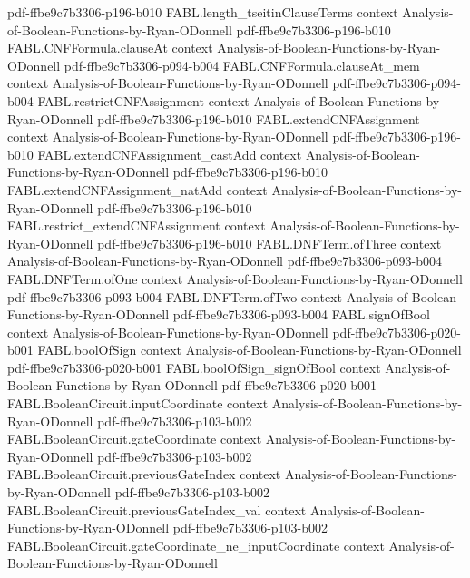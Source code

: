 \begin{theorem}
  {pdf-ffbe9c7b3306-p196-b010}
\proofstep
  {FABL.length_tseitinClauseTerms}
  {context}
  {Analysis-of-Boolean-Functions-by-Ryan-ODonnell}
  {pdf-ffbe9c7b3306-p196-b010}
\proofstep
  {FABL.CNFFormula.clauseAt}
  {context}
  {Analysis-of-Boolean-Functions-by-Ryan-ODonnell}
  {pdf-ffbe9c7b3306-p094-b004}
\proofstep
  {FABL.CNFFormula.clauseAt_mem}
  {context}
  {Analysis-of-Boolean-Functions-by-Ryan-ODonnell}
  {pdf-ffbe9c7b3306-p094-b004}
\proofstep
  {FABL.restrictCNFAssignment}
  {context}
  {Analysis-of-Boolean-Functions-by-Ryan-ODonnell}
  {pdf-ffbe9c7b3306-p196-b010}
\proofstep
  {FABL.extendCNFAssignment}
  {context}
  {Analysis-of-Boolean-Functions-by-Ryan-ODonnell}
  {pdf-ffbe9c7b3306-p196-b010}
\proofstep
  {FABL.extendCNFAssignment_castAdd}
  {context}
  {Analysis-of-Boolean-Functions-by-Ryan-ODonnell}
  {pdf-ffbe9c7b3306-p196-b010}
\proofstep
  {FABL.extendCNFAssignment_natAdd}
  {context}
  {Analysis-of-Boolean-Functions-by-Ryan-ODonnell}
  {pdf-ffbe9c7b3306-p196-b010}
\proofstep
  {FABL.restrict_extendCNFAssignment}
  {context}
  {Analysis-of-Boolean-Functions-by-Ryan-ODonnell}
  {pdf-ffbe9c7b3306-p196-b010}
\proofstep
  {FABL.DNFTerm.ofThree}
  {context}
  {Analysis-of-Boolean-Functions-by-Ryan-ODonnell}
  {pdf-ffbe9c7b3306-p093-b004}
\proofstep
  {FABL.DNFTerm.ofOne}
  {context}
  {Analysis-of-Boolean-Functions-by-Ryan-ODonnell}
  {pdf-ffbe9c7b3306-p093-b004}
\proofstep
  {FABL.DNFTerm.ofTwo}
  {context}
  {Analysis-of-Boolean-Functions-by-Ryan-ODonnell}
  {pdf-ffbe9c7b3306-p093-b004}
\proofstep
  {FABL.signOfBool}
  {context}
  {Analysis-of-Boolean-Functions-by-Ryan-ODonnell}
  {pdf-ffbe9c7b3306-p020-b001}
\proofstep
  {FABL.boolOfSign}
  {context}
  {Analysis-of-Boolean-Functions-by-Ryan-ODonnell}
  {pdf-ffbe9c7b3306-p020-b001}
\proofstep
  {FABL.boolOfSign_signOfBool}
  {context}
  {Analysis-of-Boolean-Functions-by-Ryan-ODonnell}
  {pdf-ffbe9c7b3306-p020-b001}
\proofstep
  {FABL.BooleanCircuit.inputCoordinate}
  {context}
  {Analysis-of-Boolean-Functions-by-Ryan-ODonnell}
  {pdf-ffbe9c7b3306-p103-b002}
\proofstep
  {FABL.BooleanCircuit.gateCoordinate}
  {context}
  {Analysis-of-Boolean-Functions-by-Ryan-ODonnell}
  {pdf-ffbe9c7b3306-p103-b002}
\proofstep
  {FABL.BooleanCircuit.previousGateIndex}
  {context}
  {Analysis-of-Boolean-Functions-by-Ryan-ODonnell}
  {pdf-ffbe9c7b3306-p103-b002}
\proofstep
  {FABL.BooleanCircuit.previousGateIndex_val}
  {context}
  {Analysis-of-Boolean-Functions-by-Ryan-ODonnell}
  {pdf-ffbe9c7b3306-p103-b002}
\proofstep
  {FABL.BooleanCircuit.gateCoordinate_ne_inputCoordinate}
  {context}
  {Analysis-of-Boolean-Functions-by-Ryan-ODonnell}

\end{theorem}
